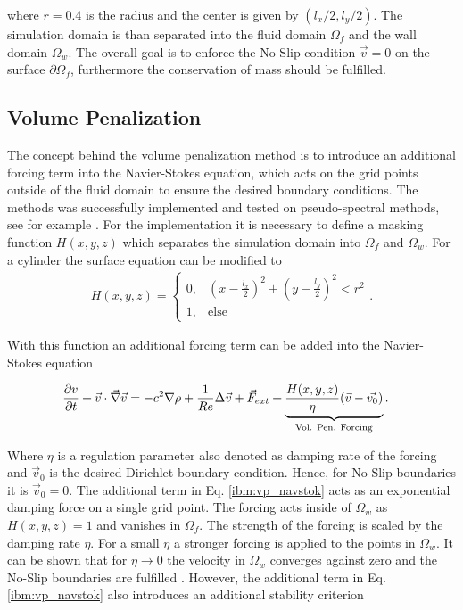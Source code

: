 where $r=0.4$ is the radius and the center is given by $(l_x/2, l_y/2)$.
The simulation domain is than separated into the fluid domain $\Omega_f$ and the wall domain $\Omega_w$.
The overall goal is to enforce the No-Slip condition $\vec{v} = 0$ on the surface $\partial \Omega_f$, furthermore
the conservation of mass should be fulfilled.


\subsection{Volume Penalization}
\label{chap:ibm_volpen}
The concept behind the volume penalization method is to introduce an additional forcing term into the Navier-Stokes equation, which acts on
the grid points outside of the fluid domain to ensure the desired boundary conditions. The methods was successfully implemented and tested
on pseudo-spectral methods, see for example \citep{Lulff2011}.
For the implementation it is necessary to define a masking function $H(x, y, z)$ which separates the simulation domain into $\Omega_f$ and $\Omega_w$.
For a cylinder the surface equation \label{ibm:eq_cylinder_intro} can be modified to
\begin{align}
    \label{ibm:masking_function}
H(x, y, z) = \begin{cases}
                    0, &  \left(x - \frac{l_x}{2}\right)^2 + \left(y - \frac{l_y}{2}\right)^2 <r^2\\
                    1, & \text{else}
             \end{cases}.
\end{align}

With this function an additional forcing term can be added into the Navier-Stokes equation

\begin{align}
    \label{ibm:vp_navstok}
    \pdn[v]{t} + \vec{v} \cdot \vec{\nabla} \vec{v} &= -c^2 \nabla \rho + \frac{1}{Re} \Delta \vec{v} + \vec{F}_{ext}
     +\underbrace{ \frac{H(x, y, z)}{\eta}(\vec{v} - \vec{v_0})}_{\text{Vol. Pen. Forcing}}.
\end{align}

Where $\eta$ is a regulation parameter also denoted as damping rate of the forcing and $\vec{v}_0$ is the desired Dirichlet boundary condition.
Hence, for No-Slip boundaries it is $\vec{v}_0 = 0 $.
The additional term in Eq. \ref{ibm:vp_navstok} acts as an exponential damping force on a single grid point.
The forcing acts inside of $\Omega_w$ as $H(x, y, z) = 1$ and vanishes in $\Omega_f$.
The strength of the forcing is scaled by the damping rate $\eta$.
For a small $\eta$ a stronger forcing is applied to the points in $\Omega_w$.
It can be shown that for $\eta\rightarrow 0$ the velocity in $\Omega_w$ converges against zero
and the No-Slip boundaries are fulfilled \citep{Lulff2011}.
However, the additional term in Eq. \ref{ibm:vp_navstok}
also introduces an additional stability criterion \citep{Lulff2011}

